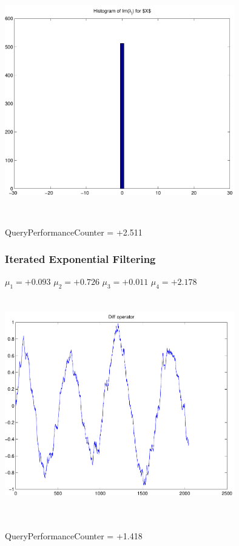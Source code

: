 \documentclass[9pt]{article}
\theoremstyle{plain}
\theoremstyle{definition}
\theoremstyle{remark}
\numberwithin{equation}{section}
\begin{document}
\includegraphics[width=10.0cm,height=10.0cm]{Im_lambda_n.pdf}

QueryPerformanceCounter  =  +2.511
\subsubsection{Iterated Exponential Filtering }
$\mu_1 =+0.093$
$\mu_2 =+0.726$
$\mu_3 =+0.011$
$\mu_4 =+2.178$
\includegraphics[width=10.0cm,height=10.0cm]{DIFF.pdf}

QueryPerformanceCounter  =  +1.418
\end{document}
